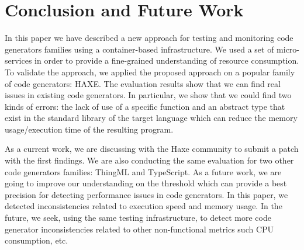 \section{Conclusion and Future Work}

In this paper we have described a new approach for testing and monitoring code generators families using a container-based infrastructure. 
We used a set of micro-services in order to provide a fine-grained understanding of resource consumption. 
To validate the approach, we applied the proposed approach on a popular family of code generators: HAXE. 
The evaluation results show that we can find real issues in existing code generators. 
In particular, we show that we could find two kinds of errors: the lack of use of a specific function and an abstract type that exist in the standard library of the target language which can reduce the memory usage/execution time of the resulting program.

As a current work, we are discussing with the Haxe community to submit a patch with the first findings. 
We are also conducting the same evaluation for two other code generators families: ThingML and TypeScript. 
As a future work, we are going to improve our understanding on the threshold which can provide a best precision for detecting performance issues in code generators. 
In this paper, we detected inconsistencies related to execution speed and memory usage. In the future, we seek, using the same testing infrastructure, to detect more code generator inconsistencies related to other non-functional metrics such CPU consumption, etc. 

